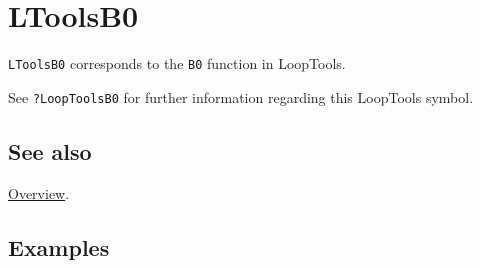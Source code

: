 \documentclass[../FeynHelpersManual.tex]{subfiles}
\begin{document}
\hypertarget{ltoolsb0}{
\section{LToolsB0}\label{ltoolsb0}}

\texttt{LToolsB0} corresponds to the \texttt{B0} function in LoopTools.

See \texttt{?LoopTools\textasciigrave B0} for further information
regarding this LoopTools symbol.

\subsection{See also}

\hyperlink{toc}{Overview}.

\subsection{Examples}
\end{document}
